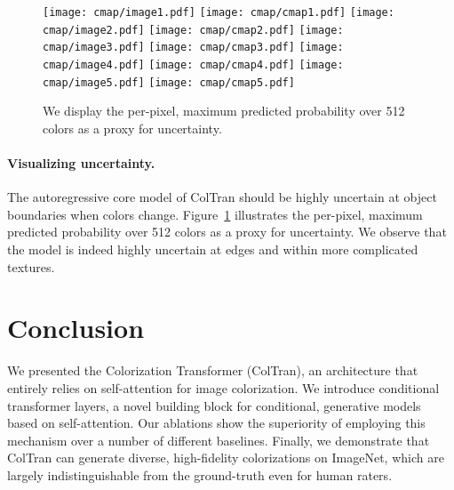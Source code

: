 \documentclass{article} \usepackage{iclr2021_conference,times}
\begin{document}
\begin{figure}[t]
\centering
\setlength{\lineskip}{0pt}
    
  \texttt{[image: cmap/image1.pdf]}
  \texttt{[image: cmap/cmap1.pdf]}
  \texttt{[image: cmap/image2.pdf]}  
  \texttt{[image: cmap/cmap2.pdf]}
  \texttt{[image: cmap/image3.pdf]}  
  \texttt{[image: cmap/cmap3.pdf]}
  \texttt{[image: cmap/image4.pdf]}
  \texttt{[image: cmap/cmap4.pdf]}
 \texttt{[image: cmap/image5.pdf]}  
  \texttt{[image: cmap/cmap5.pdf]}
\caption{We display the per-pixel, maximum predicted probability over 512 colors as a proxy for uncertainty.}
\label{fig:cmap}
\end{figure}

\paragraph{Visualizing uncertainty.} The autoregressive core model of ColTran should be highly uncertain at object boundaries when colors change. Figure~\ref{fig:cmap} illustrates the per-pixel, maximum predicted probability over 512 colors as a proxy for uncertainty. We observe that the model is indeed highly uncertain at edges and within more complicated textures. 


\section{Conclusion}
We presented the Colorization Transformer (ColTran), an architecture that entirely relies on self-attention for image colorization.
We introduce conditional transformer layers, a novel building block for conditional, generative models based on self-attention. Our ablations show the superiority of employing this mechanism over a number of different baselines. Finally, we demonstrate that ColTran can generate diverse, high-fidelity colorizations on ImageNet, which are largely indistinguishable from the ground-truth even for human raters.
 


\end{document}
